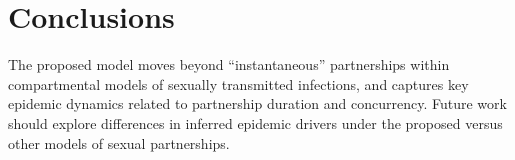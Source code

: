 \section{Conclusions}
The proposed model moves beyond ``instantaneous'' partnerships
within compartmental models of sexually transmitted infections,
and captures key epidemic dynamics related to partnership duration and concurrency.
Future work should explore differences in inferred epidemic drivers under
the proposed versus other models of sexual partnerships.
